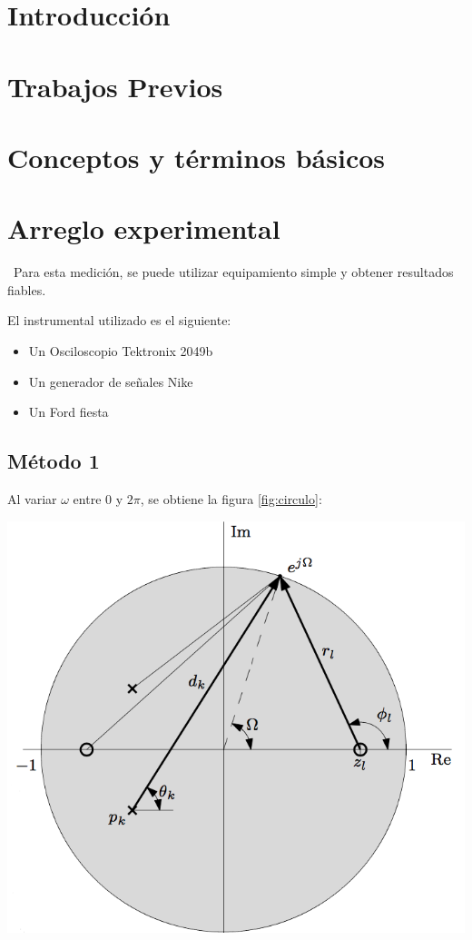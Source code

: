 \documentclass[]{article}
\makeatletter
\newenvironment{figurehere}   %
  {\def\@captype{figure}}   %
  {}              %
\makeatother
\begin{document}
\begin{multicols}{2}
\section{Introducción}
\lipsum[2]
\section{Trabajos Previos}
\lipsum[3]
\section{Conceptos y términos básicos}
\lipsum[4]
\section{Arreglo experimental}
\lipsum[5]
\
Para esta medición, se puede utilizar equipamiento simple y obtener resultados fiables.

El instrumental utilizado es el siguiente:
\begin{itemize}
  \item Un Osciloscopio Tektronix 2049b
  \item Un generador de señales Nike
  \item Un Ford fiesta
\end{itemize}
\subsection{Método 1}
\lipsum[6]
Al variar $\omega$ entre $0$ y $2 \pi$, se obtiene la figura \ref{fig:circulo}:

\begin{figurehere}
 \centering
 \includegraphics[width=\linewidth]{lathi}
 \label{fig:circulo}
\end{figurehere}


\end{multicols}
\end{document}
